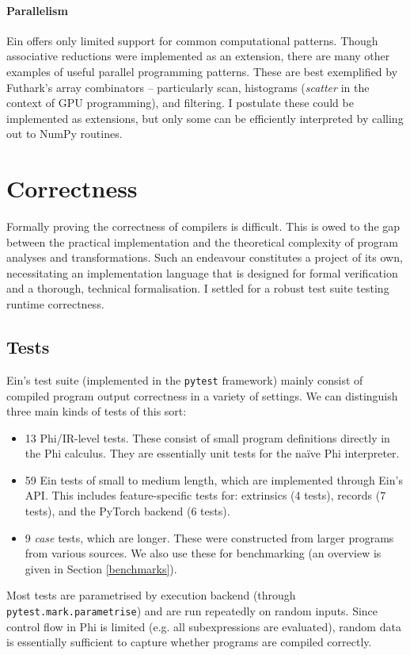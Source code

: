 \paragraph{Parallelism} Ein offers only limited support for common computational patterns. Though associative reductions were implemented as an extension, there are many other examples of useful parallel programming patterns. These are best exemplified by Futhark's array combinators -- particularly scan, histograms (\textit{scatter} in the context of GPU programming), and filtering. I postulate these could be implemented as extensions, but only some can be efficiently interpreted by calling out to NumPy routines.

\section{Correctness}

Formally proving the correctness of compilers is difficult. 
This is owed to the gap between the practical implementation and the theoretical complexity of program analyses and transformations. 
Such an endeavour constitutes a project of its own, necessitating an implementation language that is designed for formal verification and a thorough, technical formalisation. 
I settled for a robust test suite testing runtime correctness.

\subsection{Tests}

Ein's test suite (implemented in the \texttt{pytest} framework) mainly consist of compiled program output correctness in a variety of settings. 
We can distinguish three main kinds of tests of this sort:
\begin{itemize}
    \item 13 Phi/IR-level tests. These consist of small program definitions directly in the Phi calculus. They are essentially unit tests for the na\"ive Phi interpreter.
    \item 59 Ein tests of small to medium length, which are implemented through Ein's API. This includes feature-specific tests for: extrinsics (4 tests), records (7 tests), and the PyTorch backend (6 tests).
    \item 9 \textit{case} tests, which are longer. These were constructed from larger programs from various sources. We also use these for benchmarking (an overview is given in Section \ref{benchmarks}).
\end{itemize}
Most tests are parametrised by execution backend (through \texttt{pytest.mark.parametrise}) and are run repeatedly on random inputs. Since control flow in Phi is limited (e.g. all subexpressions are evaluated), random data is essentially sufficient to capture whether programs are compiled correctly. 

